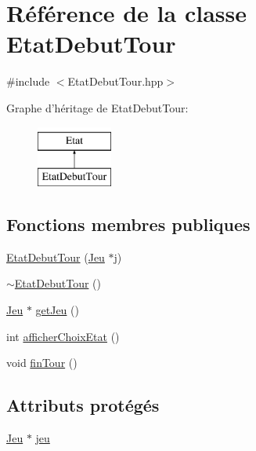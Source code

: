 \hypertarget{class_etat_debut_tour}{\section{\-Référence de la classe \-Etat\-Debut\-Tour}
\label{class_etat_debut_tour}
}


{\ttfamily \#include $<$\-Etat\-Debut\-Tour.\-hpp$>$}

\-Graphe d'héritage de \-Etat\-Debut\-Tour\-:\begin{figure}[H]
\begin{center}
\leavevmode
\includegraphics[height=2.000000cm]{class_etat_debut_tour}
\end{center}
\end{figure}
\subsection*{\-Fonctions membres publiques}
\begin{DoxyCompactItemize}
\item 
\hyperlink{class_etat_debut_tour_aa5b6ac2f696939c38ef726489c518975}{\-Etat\-Debut\-Tour} (\hyperlink{class_jeu}{\-Jeu} $\ast$j)
\item 
\hyperlink{class_etat_debut_tour_a615b6f4808730d92f52d9d1aa93a706d}{$\sim$\-Etat\-Debut\-Tour} ()
\item 
\hyperlink{class_jeu}{\-Jeu} $\ast$ \hyperlink{class_etat_debut_tour_a764bfcd224a4f306682d352a74f4cea8}{get\-Jeu} ()
\item 
int \hyperlink{class_etat_debut_tour_a603db223f7f5f4c76fd6b978b54f33ae}{afficher\-Choix\-Etat} ()
\item 
void \hyperlink{class_etat_debut_tour_a0929f3701b5a1cda1e86aed3d2b40542}{fin\-Tour} ()
\end{DoxyCompactItemize}
\subsection*{\-Attributs protégés}
\begin{DoxyCompactItemize}
\item 
\hyperlink{class_jeu}{\-Jeu} $\ast$ \hyperlink{class_etat_debut_tour_a0a54a446667e7868dc4a88efff67055d}{jeu}
\end{DoxyCompactItemize}


